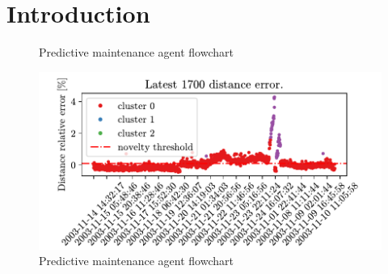 \chapter{Introduction}
\lipsum[1-10]


\prntlen{\textwidth}


%  

%  

%  



\begin{figure}[htbp]
  \centering
  
\caption{Predictive maintenance agent flowchart}
\label{fig2}
\end{figure}

\begin{figure}[htbp]
  \centering
  \includegraphics{images/Figure_1.pdf}
\caption{Predictive maintenance agent flowchart}
\label{fig2}
\end{figure}